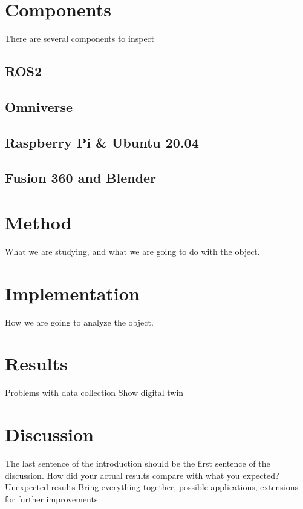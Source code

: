\documentclass[conference]{IEEEtran}
\begin{document}
    \section{Components}\label{section:components}
    There are several components to inspect

    \subsection{ROS2}\label{section:ros2}
    \subsection{Omniverse}\label{section:Omniverse}
    \subsection{Raspberry Pi \& Ubuntu 20.04}\label{section:RaspberryPi}
    \subsection{Fusion 360 and Blender}\label{section:Fusion360}
    \section{Method}\label{section:method}
    What we are studying, and what we are going to do with the object.
    \section{Implementation}\label{section:implementation}
    How we are going to analyze the object.
    \section{Results}\label{section:results}
    Problems with data collection
    Show digital twin
    \section{Discussion}\label{section:discussion}
    The last sentence of the introduction should be the first sentence of the discussion.
    How did your actual results compare with what you expected?
    Unexpected results
    Bring everything together, possible applications, extensions for further improvements
    
    
    
\end{document}
